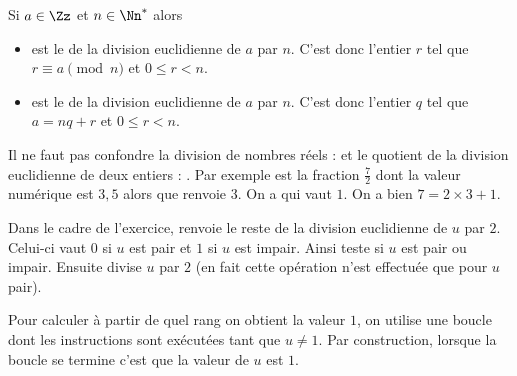 \documentclass[class=report,crop=false]{standalone}
\begin{document}
\begin{remarque*}
Si $a \in \Zz$ et $n\in\Nn^*$ alors
\begin{itemize}
  \item {} est le  de la division euclidienne de $a$ par $n$.
  C'est donc l'entier $r$ tel que $r \equiv a \pmod{n}$ et $0 \le r < n$. 
  
  \item {} est le  de la division euclidienne de $a$ par $n$.
  C'est donc l'entier $q$ tel que $a=nq+r$ et $0\leq r <n$.
\end{itemize}

Il ne faut pas confondre la division de nombres réels : 
et le quotient de la division euclidienne de deux entiers : .
Par exemple  est la fraction $\frac72$ dont la valeur numérique est $3,5$
alors que  renvoie $3$. On a  qui vaut $1$.
On a bien $7 = 2\times 3 + 1$.

Dans le cadre de l'exercice,  renvoie le reste de la division euclidienne 
de $u$ par $2$. Celui-ci vaut $0$ si $u$ est pair et $1$ si $u$ est impair.
Ainsi  teste si $u$ est pair ou impair.
Ensuite  divise $u$ par $2$
(en fait cette opération n'est effectuée que pour $u$ pair).
\end{remarque*}


Pour calculer à partir de quel rang on obtient la valeur $1$, on utilise une boucle 
 dont les instructions sont exécutées tant que $u \neq 1$.
Par construction, lorsque la boucle se termine c'est que la valeur de $u$ est $1$.


\finchapitre
\end{document}
